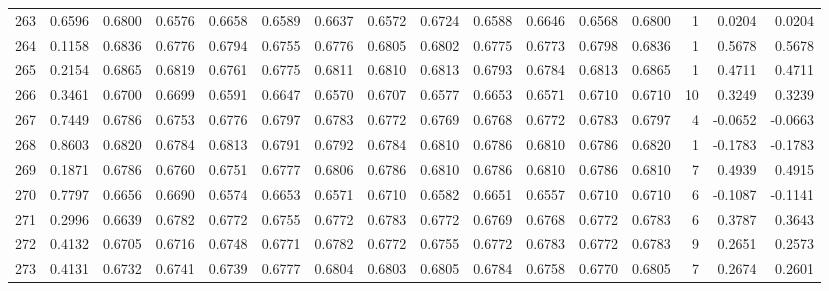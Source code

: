 \begin{tabular}{lrrrrrrrrrrrrrrr}
263 &      0.6596 &  0.6800 &  0.6576 &  0.6658 &  0.6589 &  0.6637 &  0.6572 &  0.6724 &  0.6588 &  0.6646 &   0.6568 &     0.6800 &      1 &                    0.0204 &                     0.0204 \\
264 &      0.1158 &  0.6836 &  0.6776 &  0.6794 &  0.6755 &  0.6776 &  0.6805 &  0.6802 &  0.6775 &  0.6773 &   0.6798 &     0.6836 &      1 &                    0.5678 &                     0.5678 \\
265 &      0.2154 &  0.6865 &  0.6819 &  0.6761 &  0.6775 &  0.6811 &  0.6810 &  0.6813 &  0.6793 &  0.6784 &   0.6813 &     0.6865 &      1 &                    0.4711 &                     0.4711 \\
266 &      0.3461 &  0.6700 &  0.6699 &  0.6591 &  0.6647 &  0.6570 &  0.6707 &  0.6577 &  0.6653 &  0.6571 &   0.6710 &     0.6710 &     10 &                    0.3249 &                     0.3239 \\
267 &      0.7449 &  0.6786 &  0.6753 &  0.6776 &  0.6797 &  0.6783 &  0.6772 &  0.6769 &  0.6768 &  0.6772 &   0.6783 &     0.6797 &      4 &                   -0.0652 &                    -0.0663 \\
268 &      0.8603 &  0.6820 &  0.6784 &  0.6813 &  0.6791 &  0.6792 &  0.6784 &  0.6810 &  0.6786 &  0.6810 &   0.6786 &     0.6820 &      1 &                   -0.1783 &                    -0.1783 \\
269 &      0.1871 &  0.6786 &  0.6760 &  0.6751 &  0.6777 &  0.6806 &  0.6786 &  0.6810 &  0.6786 &  0.6810 &   0.6786 &     0.6810 &      7 &                    0.4939 &                     0.4915 \\
270 &      0.7797 &  0.6656 &  0.6690 &  0.6574 &  0.6653 &  0.6571 &  0.6710 &  0.6582 &  0.6651 &  0.6557 &   0.6710 &     0.6710 &      6 &                   -0.1087 &                    -0.1141 \\
271 &      0.2996 &  0.6639 &  0.6782 &  0.6772 &  0.6755 &  0.6772 &  0.6783 &  0.6772 &  0.6769 &  0.6768 &   0.6772 &     0.6783 &      6 &                    0.3787 &                     0.3643 \\
272 &      0.4132 &  0.6705 &  0.6716 &  0.6748 &  0.6771 &  0.6782 &  0.6772 &  0.6755 &  0.6772 &  0.6783 &   0.6772 &     0.6783 &      9 &                    0.2651 &                     0.2573 \\
273 &      0.4131 &  0.6732 &  0.6741 &  0.6739 &  0.6777 &  0.6804 &  0.6803 &  0.6805 &  0.6784 &  0.6758 &   0.6770 &     0.6805 &      7 &                    0.2674 &                     0.2601 \\

\end{tabular}
